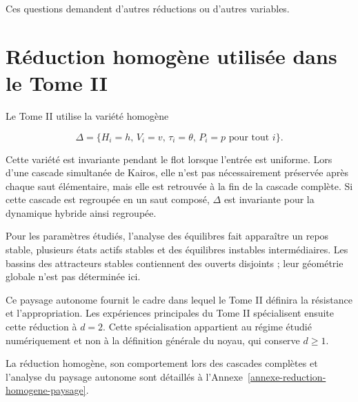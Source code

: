 Ces questions demandent d'autres réductions ou d'autres variables.

\chapter{Réduction homogène utilisée dans le Tome II}\label{t1-reduction-homogene-tome-ii}

Le Tome II utilise la variété homogène

\[
\Delta
=
\{
H_i=h,\,
V_i=v,\,
\tau_i=\theta,\,
P_i=p
\text{ pour tout }i
\}.
\]

Cette variété est invariante pendant le flot lorsque l'entrée est uniforme. Lors d'une cascade simultanée de Kairos, elle n'est pas nécessairement préservée après chaque saut élémentaire, mais elle est retrouvée à la fin de la cascade complète. Si cette cascade est regroupée en un saut composé, \(\Delta\) est invariante pour la dynamique hybride ainsi regroupée.

Pour les paramètres étudiés, l'analyse des équilibres fait apparaître un repos stable, plusieurs états actifs stables et des équilibres instables intermédiaires. Les bassins des attracteurs stables contiennent des ouverts disjoints ; leur géométrie globale n'est pas déterminée ici.

Ce paysage autonome fournit le cadre dans lequel le Tome II définira la résistance et l'appropriation. Les expériences principales du Tome II spécialisent ensuite cette réduction à \(d=2\). Cette spécialisation appartient au régime étudié numériquement et non à la définition générale du noyau, qui conserve \(d\geq1\).

La réduction homogène, son comportement lors des cascades complètes et l'analyse du paysage autonome sont détaillés à l'Annexe~\ref{annexe-reduction-homogene-paysage}.